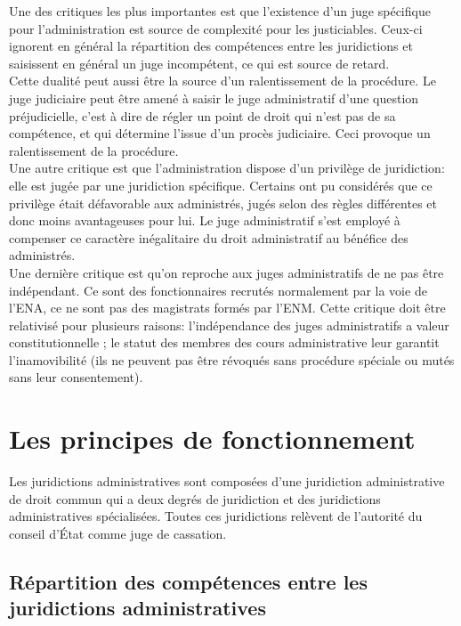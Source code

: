 \documentclass[12pt, a4paper, openany]{book}
\begin{document}
Une des critiques les plus importantes est que l'existence d'un juge spécifique pour l'administration est source de complexité pour les justiciables. Ceux-ci ignorent en général la répartition des compétences entre les juridictions et saisissent en général un juge incompétent, ce qui est source de retard. \\
Cette dualité peut aussi être la source d'un ralentissement de la procédure. Le juge judiciaire peut être amené à saisir le juge administratif d'une question préjudicielle, c'est à dire de régler un point de droit qui n'est pas de sa compétence, et qui détermine l'issue d'un procès judiciaire. Ceci provoque un ralentissement de la procédure. \\
Une autre critique est que l'administration dispose d'un privilège de juridiction: elle est jugée par une juridiction spécifique. Certains ont pu considérés que ce privilège était défavorable aux administrés, jugés selon des règles différentes et donc moins avantageuses pour lui. Le juge administratif s'est employé à compenser ce caractère inégalitaire du droit administratif au bénéfice des administrés. \\
Une dernière critique est qu'on reproche aux juges administratifs de ne pas être indépendant. Ce sont des fonctionnaires recrutés normalement par la voie de l'ENA, ce ne sont pas des magistrats formés par l'ENM. Cette critique doit être relativisé pour plusieurs raisons: l'indépendance des juges administratifs a valeur constitutionnelle ; le statut des membres des cours administrative leur garantit l'inamovibilité (ils ne peuvent pas être révoqués sans procédure spéciale ou mutés sans leur consentement). 



\chapter{Les principes de fonctionnement}

Les juridictions administratives sont composées d'une juridiction administrative de droit commun qui a deux degrés de juridiction et des juridictions administratives spécialisées. Toutes ces juridictions relèvent de l'autorité du conseil d'État comme juge de cassation. 


\section{Répartition des compétences entre les juridictions administratives}
\end{document}
